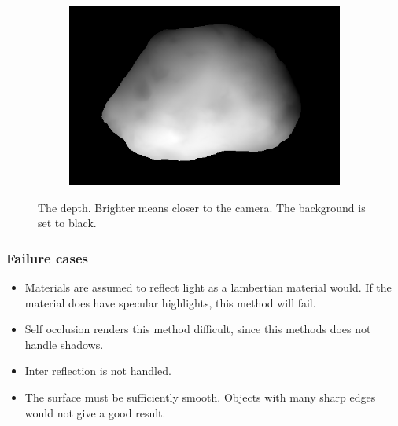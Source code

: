\documentclass{paper}
\begin{document}
\begin{figure}[h!]
\begin{subfigure}{0.3\textwidth}
        \end{subfigure}
        ~ 
        \begin{subfigure}{0.3\textwidth}
                \includegraphics[width=\textwidth]{report_fig/rock_d}
        \end{subfigure}
        \caption{The depth. Brighter means closer to the camera.
        The background is set to black.}
        \label{fig:depth}
\end{figure}

\subsubsection{Failure cases}
\begin{itemize}
\item Materials are assumed to reflect light as a lambertian material would. 
If the material does have specular highlights, this method will fail.

\item Self occlusion renders
this method difficult, since this methods does not handle shadows.

\item Inter reflection is not handled. 

\item The surface must be sufficiently smooth.
Objects with many sharp edges would not give a good result.
\end{itemize}
\end{document}
